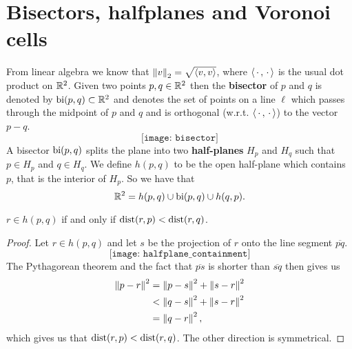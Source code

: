 \section{Bisectors, halfplanes and Voronoi cells}
From linear algebra we know that $\left\lVert v \right\rVert_2 = \sqrt{\left\langle v, v \right\rangle}$, where $\left\langle \,\cdot\,, \,\cdot\, \right\rangle$ is the usual dot product on $\mathbb{R}^2$. Given two points $p, q \in \mathbb{R}^2$ then the \textbf{bisector} of $p$ and $q$ is denoted by $\operatorname{bi}(p, q) \subset \mathbb{R}^2$ and denotes the set of points on a line $\ell$ which passes through the midpoint of $p$ and $q$ and is orthogonal (w.r.t. $\left\langle \,\cdot\,, \,\cdot\, \right\rangle$) to the vector $p - q$.
\[
    \texttt{[image: bisector]} %
\]
A bisector $\operatorname{bi}(p, q)$ splits the plane into two \textbf{half-planes} $H_p$ and $H_q$ such that $p \in H_p$ and $q \in H_q$. We define $h(p, q)$ to be the open half-plane which contains $p$, that is the interior of $H_p$. So we have that
\[
    \mathbb{R}^2 = h(p, q) \cup \operatorname{bi}(p, q) \cup h(q, p).
\]
\begin{prop} \label{prop:hyperplaneinclusionproperty}
$r \in h(p, q)$ if and only if $\operatorname{dist}(r, p) < \operatorname{dist}(r, q)$.
\end{prop}
\begin{proof}
Let $r \in h(p, q)$ and let $s$ be the projection of $r$ onto the line segment $\overline{pq}$.
\[
    \texttt{[image: halfplane\_containment]} %
\]
The Pythagorean theorem and the fact that $\overline{ps}$ is shorter than $\overline{sq}$ then gives us
\begin{align*}
    \left\lVert p - r \right\rVert^2 &= \left\lVert p - s \right\rVert^2 + \left\lVert s - r \right\rVert^2 \\
    &< \left\lVert q - s \right\rVert^2 + \left\lVert s - r \right\rVert^2 \\
    &= \left\lVert q - r \right\rVert^2,
\end{align*}
which gives us that $\operatorname{dist}(r, p) < \operatorname{dist}(r, q)$. The other direction is symmetrical.

\end{proof}

